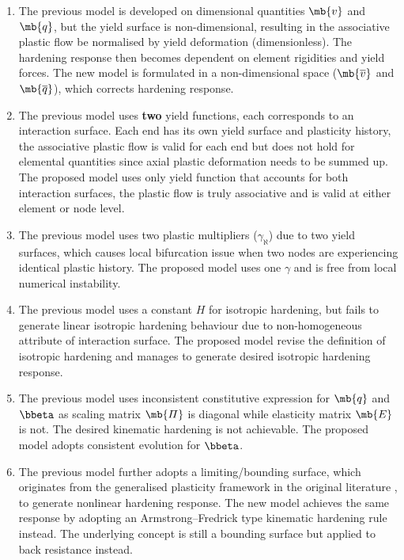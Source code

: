 \begin{enumerate}
\item The previous model is developed on dimensional quantities $\mb{v}$ and $\mb{q}$, but the yield surface is non-dimensional, resulting in the associative plastic flow be normalised by yield deformation (dimensionless). The hardening response then becomes dependent on element rigidities and yield forces. The new model is formulated in a non-dimensional space ($\mb{\overline{v}}$ and $\mb{\overline{q}}$), which corrects hardening response.
\item The previous model uses \textbf{two} yield functions, each corresponds to an interaction surface. Each end has its own yield surface and plasticity history, the associative plastic flow is valid for each end but does not hold for elemental quantities since axial plastic deformation needs to be summed up. The proposed model uses only  yield function that accounts for both interaction surfaces, the plastic flow is truly associative and is valid at either element or node level.
\item The previous model uses two plastic multipliers ($\gamma_\aleph$) due to two yield surfaces, which causes local bifurcation issue when two nodes are experiencing identical plastic history. The proposed model uses one $\gamma$ and is free from local numerical instability.
\item The previous model uses a constant $H$ for isotropic hardening, but fails to generate linear isotropic hardening behaviour due to non-homogeneous attribute of interaction surface. The proposed model revise the definition of isotropic hardening and manages to generate desired isotropic hardening response.
\item The previous model uses inconsistent constitutive expression for $\mb{q}$ and $\bbeta$ as scaling matrix $\mb{\varPi}$ is diagonal while elasticity matrix $\mb{E}$ is not. The desired kinematic hardening is not achievable. The proposed model adopts consistent evolution for $\bbeta$.
\item The previous model further adopts a limiting/bounding surface, which originates from the generalised plasticity framework in the original literature \cite{Auricchio1994}, to generate nonlinear hardening response. The new model achieves the same response by adopting an Armstrong--Fredrick type kinematic hardening rule instead. The underlying concept is still a bounding surface but applied to back resistance instead.
\end{enumerate}


